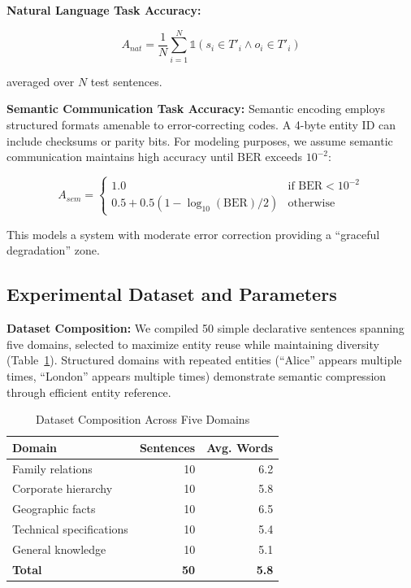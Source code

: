 \documentclass[conference]{IEEEtran}
\begin{document}
\textbf{Natural Language Task Accuracy:}

\begin{equation}
A_{nat} = \frac{1}{N}\sum_{i=1}^{N} \mathbb{1}(s_i \in T'_i \land o_i \in T'_i)
\label{eq:task_acc_nat}
\end{equation}

averaged over $N$ test sentences.

\textbf{Semantic Communication Task Accuracy:} Semantic encoding employs 
structured formats amenable to error-correcting codes. A 4-byte entity 
ID can include checksums or parity bits. For modeling purposes, we assume 
semantic communication maintains high accuracy until BER exceeds $10^{-2}$:

\begin{equation}
A_{sem} = \begin{cases}
1.0 & \text{if BER} < 10^{-2} \\
0.5 + 0.5(1 - \log_{10}(\text{BER})/2) & \text{otherwise}
\end{cases}
\label{eq:task_acc_sem}
\end{equation}

This models a system with moderate error correction providing a ``graceful 
degradation'' zone.

\subsection{Experimental Dataset and Parameters}

\textbf{Dataset Composition:} We compiled 50 simple declarative sentences 
spanning five domains, selected to maximize entity reuse while maintaining 
diversity (Table~\ref{tab:dataset}). Structured domains with repeated 
entities (``Alice'' appears multiple times, ``London'' appears multiple 
times) demonstrate semantic compression through efficient entity reference.

\begin{table}[t]
\centering
\caption{Dataset Composition Across Five Domains}
\label{tab:dataset}
\begin{tabular}{lrr}
\toprule
\textbf{Domain} & \textbf{Sentences} & \textbf{Avg. Words} \\
\midrule
Family relations & 10 & 6.2 \\
Corporate hierarchy & 10 & 5.8 \\
Geographic facts & 10 & 6.5 \\
Technical specifications & 10 & 5.4 \\
General knowledge & 10 & 5.1 \\
\midrule
\textbf{Total} & \textbf{50} & \textbf{5.8} \\
\bottomrule
\end{tabular}
\end{table}
\end{document}
